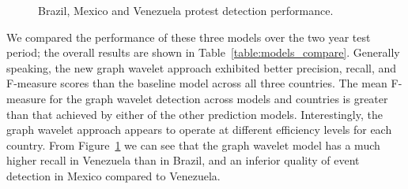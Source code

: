 \begin{figure}[h]
	\centering
	\hfill
	\hfill
	\caption{Brazil, Mexico and Venezuela protest detection performance.}
\label{fig:threecountry_performance}
\end{figure}


We compared the performance of these three models over the two year test period; the overall results are shown in Table~\ref{table:models_compare}. Generally speaking, the new graph wavelet approach exhibited better precision, recall, and F-measure scores than the baseline model across all three countries. The mean F-measure for the graph wavelet detection across models and countries is greater than that achieved by either of the other prediction models. Interestingly, the graph wavelet approach appears to operate at different efficiency levels for each country. From Figure~\ref{fig:threecountry_performance} we can see that the graph wavelet model has a much higher recall in Venezuela than in Brazil, and an inferior quality of event detection in Mexico compared to Venezuela.



